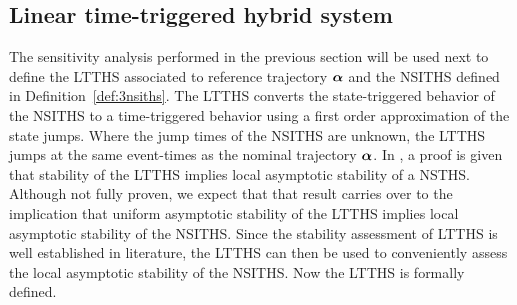 \documentclass[../DC2017114Bouma.tex]{subfiles}
\begin{document}
\subsection{Linear time-triggered hybrid system}
The sensitivity analysis performed in the previous section will be used next to define the LTTHS associated to reference trajectory $\boldsymbol{\alpha}$ and the NSITHS defined in Definition~\ref{def:3nsiths}. The LTTHS converts the state-triggered behavior of the NSITHS to a time-triggered behavior using a first order approximation of the state jumps. Where the jump times of the NSITHS are unknown, the LTTHS jumps at the same event-times as the nominal trajectory $\boldsymbol{\alpha}$. In \cite{Rijnen2017}, a proof is given that stability of the LTTHS implies local asymptotic stability of a NSTHS. Although not fully proven, we expect that that result carries over to the implication that uniform asymptotic stability of the LTTHS implies local asymptotic stability of the NSITHS. Since the stability assessment of LTTHS is well established in literature, the LTTHS can then be used to conveniently assess the local asymptotic stability of the NSITHS. Now the LTTHS is formally defined.
\end{document}
